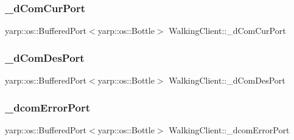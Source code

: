 \hypertarget{classWalkingClient_a1fbc9d7f1e967f24acda745028f865df}{}\label{classWalkingClient_a1fbc9d7f1e967f24acda745028f865df} 
\subsubsection{\texorpdfstring{\+\_\+d\+Com\+Cur\+Port}{\_dComCurPort}}
{\footnotesize\ttfamily yarp\+::os\+::\+Buffered\+Port$<$yarp\+::os\+::\+Bottle$>$ Walking\+Client\+::\+\_\+d\+Com\+Cur\+Port\hspace{0.3cm}{\ttfamily [private]}}

\hypertarget{classWalkingClient_a17369473b4fe2ff0eaecc7d41a8430c7}{}\label{classWalkingClient_a17369473b4fe2ff0eaecc7d41a8430c7} 
\subsubsection{\texorpdfstring{\+\_\+d\+Com\+Des\+Port}{\_dComDesPort}}
{\footnotesize\ttfamily yarp\+::os\+::\+Buffered\+Port$<$yarp\+::os\+::\+Bottle$>$ Walking\+Client\+::\+\_\+d\+Com\+Des\+Port\hspace{0.3cm}{\ttfamily [private]}}

\hypertarget{classWalkingClient_a1b01264c9d9d403a68a149d86d1bc53f}{}\label{classWalkingClient_a1b01264c9d9d403a68a149d86d1bc53f} 
\subsubsection{\texorpdfstring{\+\_\+dcom\+Error\+Port}{\_dcomErrorPort}}
{\footnotesize\ttfamily yarp\+::os\+::\+Buffered\+Port$<$yarp\+::os\+::\+Bottle$>$ Walking\+Client\+::\+\_\+dcom\+Error\+Port\hspace{0.3cm}{\ttfamily [private]}}

\hypertarget{classWalkingClient_a692d95b3e76a396d107b0c29a3d591f1}{}\label{classWalkingClient_a692d95b3e76a396d107b0c29a3d591f1} 
